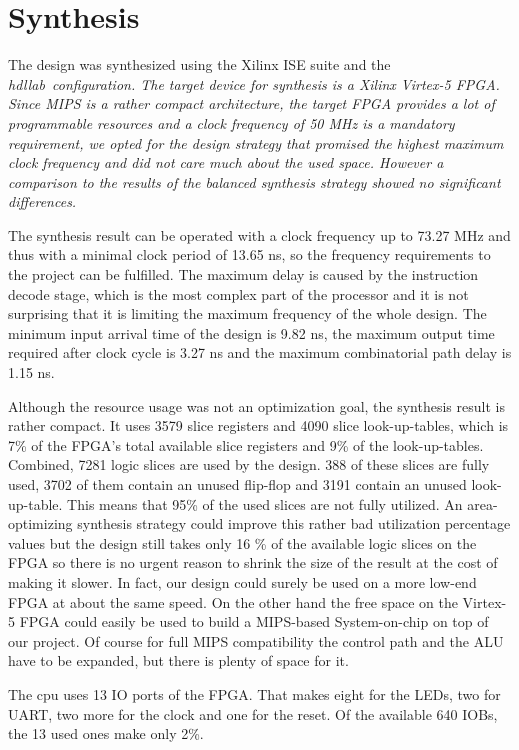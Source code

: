 \chapter{Synthesis}
The design was synthesized using the Xilinx ISE suite and the \em hdllab\em \ configuration. 
The target device for synthesis is a Xilinx Virtex-5 FPGA. Since MIPS is a rather compact architecture, the target FPGA provides 
a lot of programmable resources and a clock frequency of 50 MHz is a mandatory requirement, we opted for the design strategy that 
promised the highest maximum clock frequency and did not care much about the used space. However a comparison to the results of the 
balanced synthesis strategy showed no significant differences.

The synthesis result can be operated with a clock frequency up to 73.27 MHz and thus with a minimal clock period of 13.65 ns, 
so the frequency requirements to the project can be fulfilled. The maximum delay is caused by the instruction decode stage, 
which is the most complex part of the processor and it is not surprising that it is limiting the maximum frequency of the whole design. 
The minimum input arrival time of the design is 9.82 ns, the maximum output time required after clock cycle is 3.27 ns and the maximum combinatorial path delay is 1.15 ns.

Although the resource usage was not an optimization goal, the synthesis result is rather compact. It uses 3579 slice registers and 4090 slice look-up-tables, 
which is 7\% of the FPGA's total available slice registers and 9\% of the look-up-tables. Combined, 7281 logic slices are used by the design. 
388 of these slices are fully used, 3702 of them contain an unused flip-flop and 3191 contain an unused look-up-table. This means that 95\% of the used slices are not fully utilized. 
An area-optimizing synthesis strategy could improve this rather bad utilization percentage values but the design still takes only 16 \% of the available logic slices on the FPGA so 
there is no urgent reason to shrink the size of the result at the cost of making it slower. In fact, our design could surely be used on a more low-end FPGA at about the same speed. 
On the other hand the free space on the Virtex-5 FPGA could easily be used to build a MIPS-based System-on-chip on top of our project. Of course for full MIPS compatibility the control 
path and the ALU have to be expanded, but there is plenty of space for it.

The cpu uses 13 IO ports of the FPGA. That makes eight for the LEDs, two for UART, two more for the clock and one for the reset. Of the available 640 IOBs, the 13 used ones make only 2\%.

